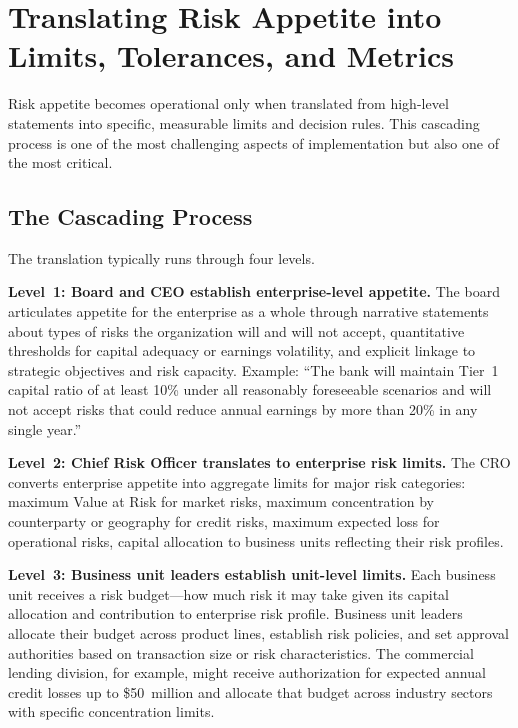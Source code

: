 \documentclass[11pt,openany]{book}
\begin{document}
\section{Translating Risk Appetite into Limits, Tolerances, and Metrics}
\label{sec:translating-appetite}

Risk appetite becomes operational only when translated from high-level statements
into specific, measurable limits and decision rules. This cascading process is
one of the most challenging aspects of implementation but also one of the most
critical.

\subsection{The Cascading Process}
\label{subsec:cascading}

The translation typically runs through four levels.

\textbf{Level~1: Board and CEO establish enterprise-level appetite.} The board
articulates appetite for the enterprise as a whole through narrative statements
about types of risks the organization will and will not accept, quantitative
thresholds for capital adequacy or earnings volatility, and explicit linkage to
strategic objectives and risk capacity. Example: ``The bank will maintain
Tier~1 capital ratio of at least 10\% under all reasonably foreseeable scenarios
and will not accept risks that could reduce annual earnings by more than 20\% in
any single year.''

\textbf{Level~2: Chief Risk Officer translates to enterprise risk limits.}
The CRO converts enterprise appetite into aggregate limits for major risk
categories: maximum Value at Risk for market risks, maximum concentration by
counterparty or geography for credit risks, maximum expected loss for
operational risks, capital allocation to business units reflecting their risk
profiles.

\textbf{Level~3: Business unit leaders establish unit-level limits.} Each
business unit receives a risk budget---how much risk it may take given its
capital allocation and contribution to enterprise risk profile. Business unit
leaders allocate their budget across product lines, establish risk policies, and
set approval authorities based on transaction size or risk characteristics. The
commercial lending division, for example, might receive authorization for
expected annual credit losses up to \$50~million and allocate that budget across
industry sectors with specific concentration limits.
\end{document}
